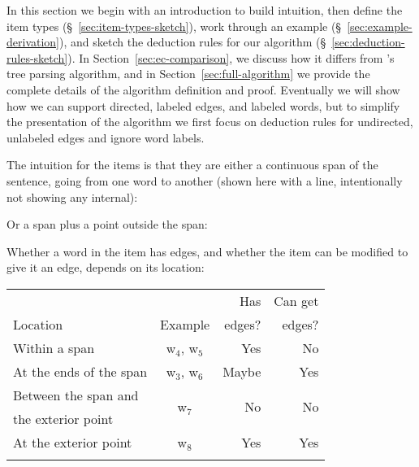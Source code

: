 In this section we begin with an introduction to build intuition, then define the item types (\S~\ref{sec:item-types-sketch}), work through an example (\S~\ref{sec:example-derivation}), and sketch the deduction rules for our algorithm (\S~\ref{sec:deduction-rules-sketch}).
In Section~\ref{sec:ec-comparison}, we discuss how it differs from \textcite{ec}'s tree parsing algorithm, and in Section~\ref{sec:full-algorithm} we provide the complete details of the algorithm definition and proof.
Eventually we will show how we can support directed, labeled edges, and labeled words, but to simplify the presentation of the algorithm we first focus on deduction rules for undirected, unlabeled edges and ignore word labels. \\

\noindent
\parbox{4in}{
The intuition for the items is that they are either a continuous span of the sentence, going from one word to another (shown here with a line, intentionally not showing any internal): \\
}\hfill{}\hfill\strut

\noindent
\parbox{4in}{
Or a span plus a point outside the span: \\
}\hfill{}\hfill\strut

\noindent
\parbox[c]{2.3in}{
Whether a word in the item has edges, and whether the item can be modified to give it an edge, depends on its location: \\
}\hfill\begin{tabular}{lcrr}
  \hline
   & & Has & Can get \\
  Location & Example & edges? & edges? \\
  \hline
  \hline
  Within a span & w$_4$, w$_5$ & Yes & No \\
  At the ends of the span & w$_3$, w$_6$ & Maybe & Yes \\
  Between the span and & \multirow{2}{*}{w$_7$} & \multirow{2}{*}{No} & \multirow{2}{*}{No} \\
  the exterior point & & & \\
  At the exterior point & w$_8$ & Yes & Yes \\
  \hline \\
\end{tabular}

